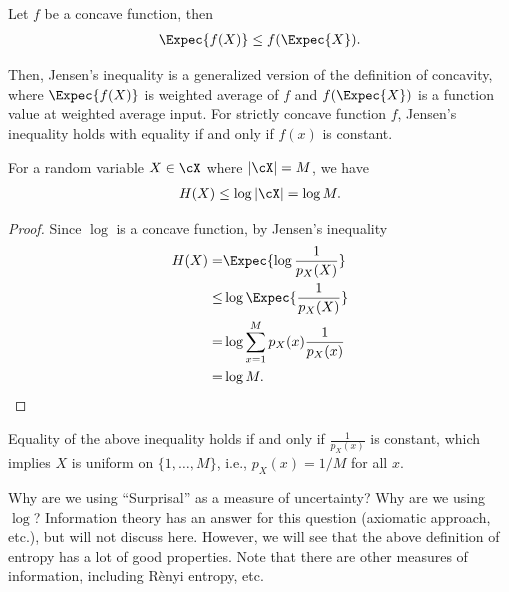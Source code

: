 \documentclass{article}
\begin{document}
\begin{theorem}
Let $f$ be a concave function, then
\begin{align}
    \Expec{f(X)} \leq f(\Expec{X}).
\end{align}
\end{theorem}
Then, Jensen's inequality is a generalized version of the definition of concavity,
where $\Expec{f(X)}$ is weighted average of $f$ and $f(\Expec{X})$ is a function value at weighted average input.
For strictly concave function $f$, Jensen's inequality holds with equality if and only if $f(x)$ is constant.

\begin{theorem}
For a random variable $X\in\cX$ where $|\cX|=M$, we have
\begin{align}
    H(X) \leq \log |\cX| = \log M.
\end{align}
\end{theorem}
\begin{proof}
Since $\log$ is a concave function, by Jensen's inequality
\begin{align}
    H(X) =& \Expec{\log \frac{1}{p_X(X)}}\\
    \leq& \log \Expec{\frac{1}{p_X(X)}}\\
    =& \log \sum_{x=1}^M p_X(x) \frac{1}{p_{X}(x)}\\
    =& \log M.
\end{align}
\end{proof}

Equality of the above inequality holds if and only if $\frac{1}{p_X(x)}$ is constant,
which implies $X$ is uniform on $\{1,\dots,M\}$, i.e., $p_X(x) = 1/M$ for all $x$.

\begin{remark}
    Why are we using ``Surprisal'' as a measure of uncertainty? Why are we using $\log$?
    Information theory has an answer for this question (axiomatic approach, etc.), but will not discuss here.
    However, we will see that the above definition of entropy has a lot of good properties.
    Note that there are other measures of information, including R\`enyi entropy, etc.
\end{remark}
\end{document}

